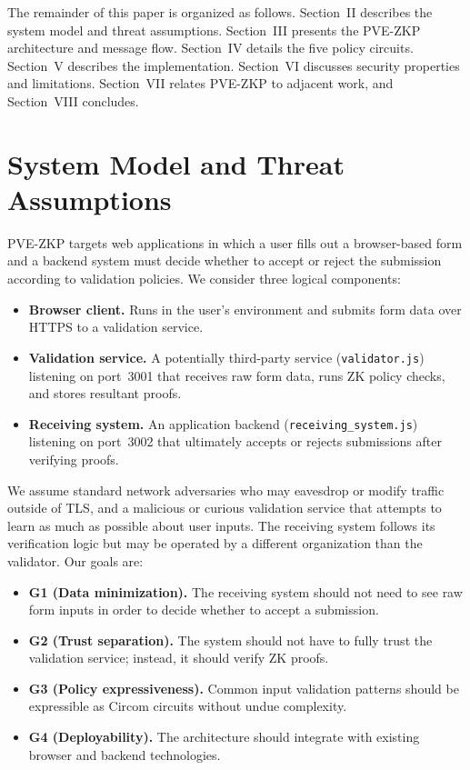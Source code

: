 \documentclass[conference]{IEEEtran}
\begin{document}
The remainder of this paper is organized as follows. Section~II describes the
system model and threat assumptions. Section~III presents the PVE-ZKP
architecture and message flow. Section~IV details the five policy circuits.
Section~V describes the implementation. Section~VI discusses security properties
and limitations. Section~VII relates PVE-ZKP to adjacent work, and
Section~VIII concludes.

\section{System Model and Threat Assumptions}

PVE-ZKP targets web applications in which a user fills out a browser-based form
and a backend system must decide whether to accept or reject the submission
according to validation policies. We consider three logical components:

\begin{itemize}[leftmargin=*]
  \item \textbf{Browser client.} Runs in the user's environment and submits
    form data over HTTPS to a validation service.
  \item \textbf{Validation service.} A potentially third-party service
    (\texttt{validator.js}) listening on port~3001 that receives raw form data,
    runs ZK policy checks, and stores resultant proofs.
  \item \textbf{Receiving system.} An application backend
    (\texttt{receiving\_system.js}) listening on port~3002 that ultimately
    accepts or rejects submissions after verifying proofs.
\end{itemize}

We assume standard network adversaries who may eavesdrop or modify traffic
outside of TLS, and a malicious or curious validation service that attempts to
learn as much as possible about user inputs. The receiving system follows its
verification logic but may be operated by a different organization than the
validator. Our goals are:

\begin{itemize}[leftmargin=*]
  \item \textbf{G1 (Data minimization).} The receiving system should not need to
    see raw form inputs in order to decide whether to accept a submission.
  \item \textbf{G2 (Trust separation).} The system should not have to fully
    trust the validation service; instead, it should verify ZK proofs.
  \item \textbf{G3 (Policy expressiveness).} Common input validation patterns
    should be expressible as Circom circuits without undue complexity.
  \item \textbf{G4 (Deployability).} The architecture should integrate with
    existing browser and backend technologies.
\end{itemize}
\end{document}
